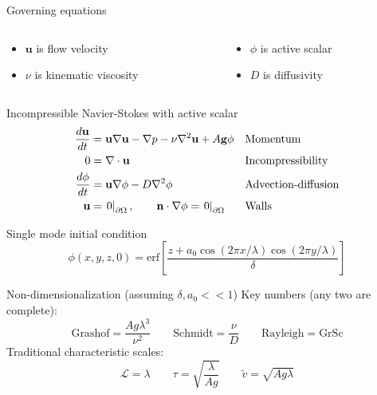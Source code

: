 \documentclass[12pt]{beamer}
\begin{document}
\begin{frame}{Governing equations}
\begin{exampleblock}{}
\begin{columns}
\begin{column}{0.5\linewidth}
\begin{itemize}
\item $\mathbf{u}$ is flow velocity
\item $\nu$ is kinematic viscosity
\end{itemize}
\end{column}
\begin{column}{0.5\linewidth}
\begin{itemize}
\item $\phi$ is active scalar
\item $D$ is diffusivity
\end{itemize}
\end{column}
\end{columns}
\end{exampleblock}
\begin{block}{Incompressible Navier-Stokes with active scalar}
\vspace{-20pt}
\begin{align*}
\frac{d \mathbf{u}}{d t} &= \mathbf{u} \nabla \mathbf{u} - \nabla p - \nu \nabla^2 \mathbf{u} + A \mathbf{g} \phi  && \text{Momentum} \\
0 &= \nabla \cdot \mathbf{u} && \text{Incompressibility} \\ 
\frac{d \phi}{d t} &= \mathbf{u} \nabla \phi - D \nabla^2 \phi && \text{Advection-diffusion} \\
\mathbf{u} &= \left. 0 \right|_{\partial \Omega}, \quad \quad \mathbf{n} \cdot \nabla \phi = \left. 0 \right|_{\partial \Omega}&& \text{Walls}
\end{align*}
\end{block}
\end{frame}

\begin{frame}
\begin{block}{Single mode initial condition}
\begin{equation*}
\phi(x,y,z,0) = \text{erf}\left[ \frac{z + a_0 \cos(2 \pi x/\lambda) \cos(2 \pi y/\lambda)}{\delta}\right]
\end{equation*}
\end{block}
\begin{exampleblock}{Non-dimensionalization (assuming $\delta, a_0 << 1$)}
Key numbers (any two are complete):
\begin{equation*}
\text{Grashof} = \frac{A g \lambda^3}{\nu^2} \qquad \text{Schmidt} = \frac{\nu}{D} \qquad \text{Rayleigh} = \text{Gr} \text{Sc}
\end{equation*}
Traditional characteristic scales:
\begin{equation*}
	\mathcal{L} = \lambda \qquad \tau = \sqrt{\frac{\lambda}{A g}} \qquad \tilde{v} = \sqrt{A g \lambda} 
\end{equation*}
\end{exampleblock}
\end{frame}
\end{document}
